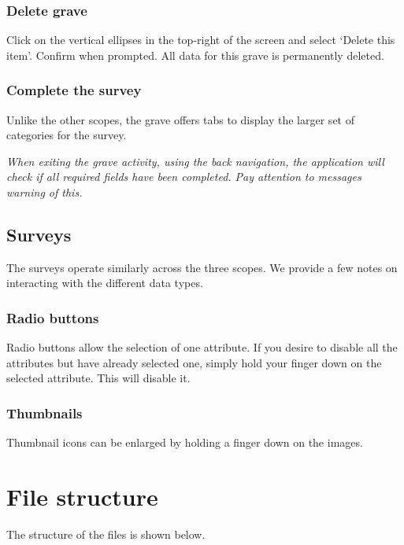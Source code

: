 \documentclass{scrreprt}
\begin{document}
\subsection{Delete grave}
Click on the vertical ellipses in the top-right of the screen and select `Delete this item'. Confirm when prompted. All data for this grave is permanently deleted.

\subsection{Complete the survey}
Unlike the other scopes, the grave offers tabs to display the larger set of categories for the survey.

\textit{When exiting the grave activity, using the back navigation, the application will check if all required fields have been completed. Pay attention to messages warning of this.}

\section{Surveys}
\label{au_surveys}
The surveys operate similarly across the three scopes. We provide a few notes on interacting with the different data types.

\subsection{Radio buttons}
Radio buttons allow the selection of one attribute. If you desire to disable all the attributes but have already selected one, simply hold your finger down on the selected attribute. This will disable it.

\subsection{Thumbnails}
Thumbnail icons can be enlarged by holding a finger down on the images.

\chapter{File structure}
\label{file_structure}
The structure of the files is shown below.
\end{document}
